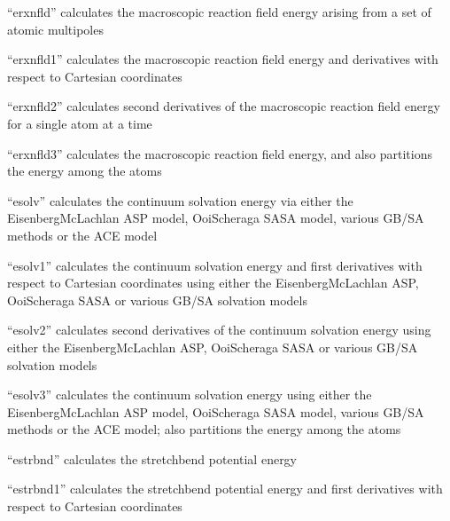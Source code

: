 \documentclass[letterpaper,11pt,english]{sphinxmanual}
\begin{document}

“erxnfld” calculates the macroscopic reaction field energy arising from a set of atomic multipoles


“erxnfld1” calculates the macroscopic reaction field energy and derivatives with respect to Cartesian coordinates


“erxnfld2” calculates second derivatives of the macroscopic reaction field energy for a single atom at a time


“erxnfld3” calculates the macroscopic reaction field energy, and also partitions the energy among the atoms


“esolv” calculates the continuum solvation energy via either the Eisenberg\sphinxhyphen{}McLachlan ASP model, Ooi\sphinxhyphen{}Scheraga SASA model, various GB/SA methods or the ACE model


“esolv1” calculates the continuum solvation energy and first derivatives with respect to Cartesian coordinates using either the Eisenberg\sphinxhyphen{}McLachlan ASP, Ooi\sphinxhyphen{}Scheraga SASA or various GB/SA solvation models


“esolv2” calculates second derivatives of the continuum solvation energy using either the Eisenberg\sphinxhyphen{}McLachlan ASP, Ooi\sphinxhyphen{}Scheraga SASA or various GB/SA solvation models


“esolv3” calculates the continuum solvation energy using either the Eisenberg\sphinxhyphen{}McLachlan ASP model, Ooi\sphinxhyphen{}Scheraga SASA model, various GB/SA methods or the ACE model; also partitions the energy among the atoms


“estrbnd” calculates the stretch\sphinxhyphen{}bend potential energy


“estrbnd1” calculates the stretch\sphinxhyphen{}bend potential energy and first derivatives with respect to Cartesian coordinates
\end{document}
